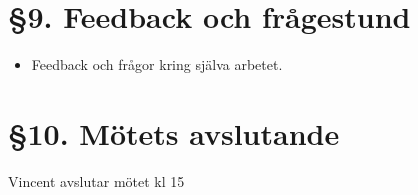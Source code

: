 \documentclass[a4paper, 11pt]{article}
\begin{document}
\section*{§9. Feedback och frågestund}
\begin{itemize}
    \item Feedback och frågor kring själva arbetet.\\
\end{itemize}
    \section*{§10. Mötets avslutande}
Vincent avslutar mötet kl 15
\newpage
\thispagestyle{style2}
\makebox{}\\
\makebox{}\\
\makebox{}\\
\makebox[0.4\linewidth]{\rule{0.4\linewidth}{0.4pt}} \hspace{1cm} \makebox[0.4\linewidth]{\rule{0.4\linewidth}{0.4pt}} \hspace{1cm}\\
 \hspace{1cm}
 \hspace{1cm}\\
 \hspace{1cm}
 \hspace{1cm}\\
\makebox{}\\
\makebox{}\\
\makebox{}\\
\end{document}

